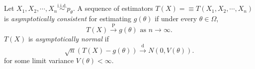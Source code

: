 \documentclass[a4paper]{article}
\begin{document}
\begin{defi}
	Let $X_1,X_2,\cdots,X_n \stackrel{\text{i.i.d.}}{\sim} p_{\theta}$. A sequence of estimators $T(X) =\equiv T(X_1,X_2,\cdots,X_n)$ is \emph{asymptotically consistent} for estimating $g(\theta)$ if under every $\theta \in \Omega$,
	\begin{equation}
		T(X) \stackrel{\text{P}}{\longrightarrow} g(\theta) \text{ as } n \to \infty.
	\end{equation}
	$T(X)$ is \emph{asymptotically normal} if
	\begin{equation}
		\sqrt{n}(T(X) - g(\theta)) \stackrel{\text{d}}{\longrightarrow} N(0,V(\theta)).
	\end{equation}
	for some limit variance $V(\theta) < \infty$.
\end{defi}	
\end{document}
